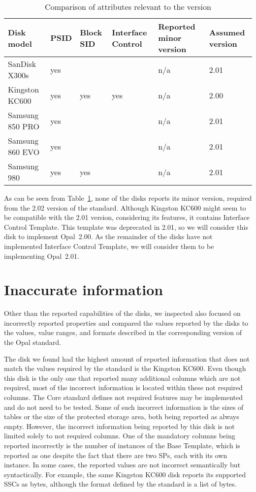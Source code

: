 \begin{table}
\small
\begin{tabularx}{\textwidth}{lXXXXX}
\toprule
  Disk model & PSID & Block SID & Interface Control & Reported minor version & Assumed version \\
\midrule
SanDisk X300s       & yes &     &     & n/a & 2.01       \\
Kingston KC600      & yes & yes & yes & n/a & 2.00       \\
Samsung 850 PRO     & yes &     &     & n/a & 2.01       \\
Samsung 860 EVO     & yes &     &     & n/a & 2.01       \\
Samsung 980         & yes & yes &     & n/a & 2.01       \\ 
\bottomrule
\end{tabularx}
\caption{Comparison of attributes relevant to the version}
\label{table:compare_versions}
\end{table}


As can be seen from Table~\ref{table:compare_versions}, none of the disks reports its minor version, required from the 2.02 version of the standard.
Although Kingston KC600 might seem to be compatible with the 2.01 version, considering its features, it contains Interface Control Template. This template was deprecated in 2.01, so we will consider this disk to implement Opal~2.00.
As the remainder of the disks have not implemented Interface Control Template, we will consider them to be implementing Opal~2.01.

\section{Inaccurate information}

Other than the reported capabilities of the disks, we inspected also focused on incorrectly reported properties and compared the values reported by the disks to the values, value ranges, and formats described in the corresponding version of the Opal standard. 

The disk we found had the highest amount of reported information that does not match the values required by the standard is the Kingston KC600. 
Even though this disk is the only one that reported many additional columns which are not required, most of the incorrect information is located within these not required columns.
The Core standard defines not required features may be implemented and do not need to be tested.
Some of such incorrect information is the sizes of tables or the size of the protected storage area, both being reported as always empty.
However, the incorrect information being reported by this disk is not limited solely to not required columns. One of the mandatory columns being reported incorrectly is the number of instances of the Base Template, which is reported as one despite the fact that there are two SPs, each with its own instance. 
In some cases, the reported values are not incorrect semantically but syntactically. For example, the same Kingston KC600 disk reports its supported SSCs as bytes, although the format defined by the standard is a list of bytes.

